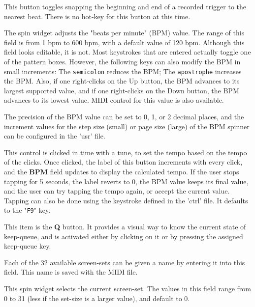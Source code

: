    This button toggles snapping the beginning and end of a recorded trigger to
   the nearest beat.  There is no hot-key for this button at this time.

   The spin widget adjusts the "beats per minute" (BPM) value.  The
   range of this field is from 1 bpm to 600 bpm, with a default value of
   120 bpm.
   Although this field looks editable, it is not.  Most keystrokes
   that are entered actually toggle one of the pattern boxes.
   However, the following keys can also modify the BPM in small increments:
   The \texttt{semicolon} reduces the BPM;
   The \texttt{apostrophe} increases the BPM.
   Also, if one right-clicks on the Up button, the BPM advances to its largest
   supported value, and if one right-clicks on the Down button, the BPM
   advances to its lowest value.
   MIDI control for this value is also available.

   The precision of the BPM value can be set to 0, 1, or 2
   decimal places, and the increment values for the step size (small)
   or page size (large) of the BPM spinner can be configured in the 'usr' file.

   This control is clicked in time with a tune, to set the
   tempo based on the tempo of the clicks.  Once clicked, the label of this
   button increments with every click, and the \textbf{BPM} field updates to
   display the calculated tempo.  If the user stops tapping for 5 seconds, the
   label reverts to 0, the BPM value keeps its final value, and the user can
   try tapping the tempo again, or accept the current value.
   Tapping can also be done using the keystroke defined
   in the 'ctrl' file.
   It defaults to the "\texttt{F9}" key.

   This item is the \textbf{Q} button.
   It provides a visual way to know the current state of keep-queue, and is
   activated either by clicking on it or by pressing the assigned keep-queue
   key.

   Each of the 32 available screen-sets can be given a name by entering it
   into this field.  This name is saved with the MIDI file.

   This spin widget selects the current screen-set.  The values in this
   field range from 0 to 31 (less if the set-size is a larger value),
   and default to 0.

